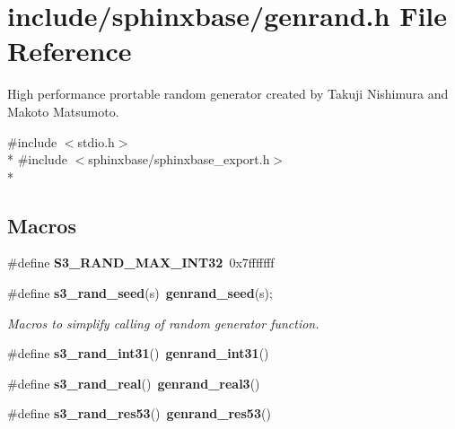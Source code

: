 \section{include/sphinxbase/genrand.h File Reference}
\label{genrand_8h}


High performance prortable random generator created by Takuji Nishimura and Makoto Matsumoto.  


{\ttfamily \#include $<$stdio.\+h$>$}\\*
{\ttfamily \#include $<$sphinxbase/sphinxbase\+\_\+export.\+h$>$}\\*
\subsection*{Macros}
\begin{DoxyCompactItemize}
\item 
\#define {\bfseries S3\+\_\+\+R\+A\+N\+D\+\_\+\+M\+A\+X\+\_\+\+I\+N\+T32}~0x7fffffff\label{genrand_8h_a29d6253e4a57e7c4d56cf7f6155b4007}

\item 
\#define {\bf s3\+\_\+rand\+\_\+seed}(s)~{\bf genrand\+\_\+seed}(s);\label{genrand_8h_a88ed88daecb88e115d8559c1b0a09bb7}

\begin{DoxyCompactList}\small\item\em Macros to simplify calling of random generator function. \end{DoxyCompactList}\item 
\#define {\bfseries s3\+\_\+rand\+\_\+int31}()~{\bf genrand\+\_\+int31}()\label{genrand_8h_a3dcc058023a95c0a0ca1f12d1fdec9b9}

\item 
\#define {\bfseries s3\+\_\+rand\+\_\+real}()~{\bf genrand\+\_\+real3}()\label{genrand_8h_a85a5844eace98dcbb4742d408a75d5e7}

\item 
\#define {\bfseries s3\+\_\+rand\+\_\+res53}()~{\bf genrand\+\_\+res53}()\label{genrand_8h_a226b9a1deec002aeb1f1775b830a3062}

\end{DoxyCompactItemize}
